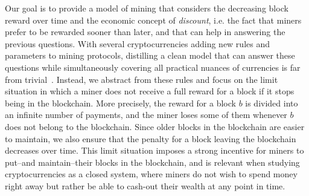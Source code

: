 Our goal is to provide a model of mining that considers the decreasing block reward over time and the economic concept of \emph{discount}, i.e. the fact that miners prefer to be rewarded sooner than later, and that can help in answering the previous questions. 
With several cryptocurrencies adding new rules and parameters to mining protocols, distilling a clean model that can answer these questions while simultaneously covering 
all practical nuances of currencies is far from trivial~\cite{mininggames:2016}. 
Instead, we abstract from these rules and focus on the limit situation in which a miner does not receive a full reward for a block if it stops being in the blockchain. 
More precisely, the reward for a block $b$ is divided into an infinite number of payments, and the miner loses some of them whenever $b$ does not belong to the blockchain. 
Since older blocks in the blockchain are easier to maintain, we also ensure that the penalty for a block leaving the blockchain decreases over time. 
This limit situation imposes a strong incentive for miners to put--and maintain--their blocks in the blockchain, and is relevant when studying cryptocurrencies
as a closed system, where miners do 
not wish to spend money right away but rather be able to cash-out their wealth at any point in time. 
%
